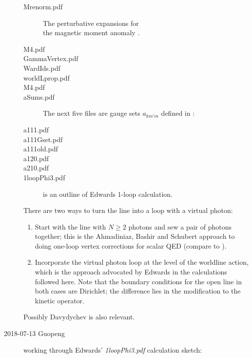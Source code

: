 \begin{description}
\begin{description}
  \item[Mrenorm.pdf]
The perturbative expansions for\\
the magnetic moment anomaly .
  \item[M4.pdf]
  \item[GammaVertex.pdf]
  \item[WardIds.pdf]
  \item[worldLprop.pdf]
  \item[M4.pdf]
  \item[aSums.pdf]
The next five files are gauge sets $a_{km'm}$ defined in :
  \item[a111.pdf]
  \item[a111Gset.pdf]
  \item[a111old.pdf]
  \item[a120.pdf]
  \item[a210.pdf]
  \item[1loopPhi3.pdf] is an outline of Edwards 1-loop calculation.
\end{description}
    There are two ways to turn the line into a loop with a virtual photon:
    \begin{enumerate}
	\item
Start with the line with $N \geqslant 2$ photons and sew a pair of photons
together; this is the Ahmadiniaz, Bashir and Schubert approach to
doing one-loop vertex corrections for scalar QED (compare to
).
	\item
Incorporate the virtual photon loop at the level of the worldline
action, which is the approach advocated by Edwards in
the calculations followed here. Note that the boundary conditions
for the open line in both cases are Dirichlet; the
difference lies in the modification to the kinetic operator.
    \end{enumerate}
Possibly Davydychev is also relevant.


\item[2018-07-13 Guopeng]
working through Edwards' {\em 1loopPhi3.pdf} calculation sketch:


\end{description}
